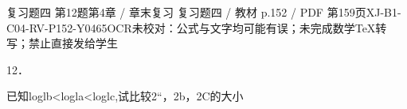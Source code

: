 \begin{bankitem}{复习题四 第12题}{第4章 / 章末复习 复习题四 / 教材 p.152 / PDF 第159页}{XJ-B1-C04-RV-P152-Y0465}{OCR未校对：公式与文字均可能有误；未完成数学TeX转写；禁止直接发给学生}
\begin{ocrdraft}
\par
12．
\par
已知loglb<logla<loglc,试比较2“，2b，2C的大小
\end{ocrdraft}
\end{bankitem}
